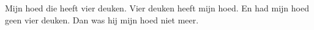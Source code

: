 \beginverse*
Mijn hoed die heeft vier deuken.
Vier deuken heeft mijn hoed.
En had mijn hoed geen vier deuken.
Dan was hij mijn hoed niet meer.
\endverse
\endsong